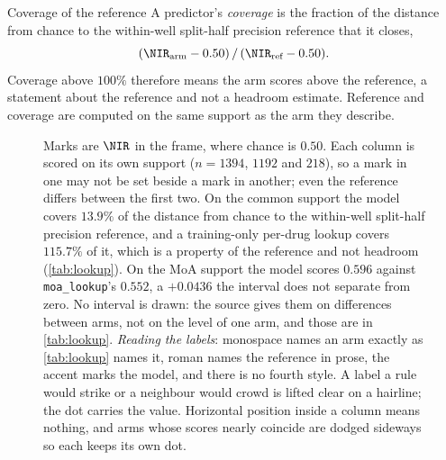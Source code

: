 \begin{defn}{Coverage of the reference}
A predictor's \emph{coverage} is the fraction of the distance from chance to the
within-well split-half precision reference that it closes,
\[
  (\NIR_{\text{arm}} - 0.50)\,/\,(\NIR_{\text{ref}} - 0.50).
\]
Coverage above $100\%$ therefore means the arm scores above the reference, a
statement about the reference and not a headroom estimate. Reference and coverage
are computed on the same support as the arm they describe.
\end{defn}

\begin{figure}[htbp]
\centering

\caption[The baseline ladder]{ Marks are $\NIR$ in the \Rframe{}
frame, where chance is $0.50$. Each column is scored on its own support
($n = \num{1394}$, $\num{1192}$ and $\num{218}$), so a mark in one may not be set
beside a mark in another; even the reference differs between the first two. On
the common support the model covers $13.9\%$ of the distance from chance to the
within-well split-half precision reference, and a training-only per-drug lookup
covers $115.7\%$ of it, which is a property of the reference and not headroom
(\cref{tab:lookup}). On the MoA support the model scores $0.596$ against
\texttt{moa\_lookup}'s $0.552$, a $+0.0436$ the interval does not separate from
zero. No interval is drawn: the source gives them on differences between arms,
not on the level of one arm, and those are in \cref{tab:lookup}. \emph{Reading
the labels}: monospace names an arm exactly as \cref{tab:lookup} names it, roman
names the reference in prose, the accent marks the model, and there is no fourth
style. A label a rule would strike or a neighbour would crowd is lifted clear on
a hairline; the dot carries the value. Horizontal position inside a column means
nothing, and arms whose scores nearly coincide are dodged sideways so each keeps
its own dot.}
\label{fig:ladder}
\end{figure}

